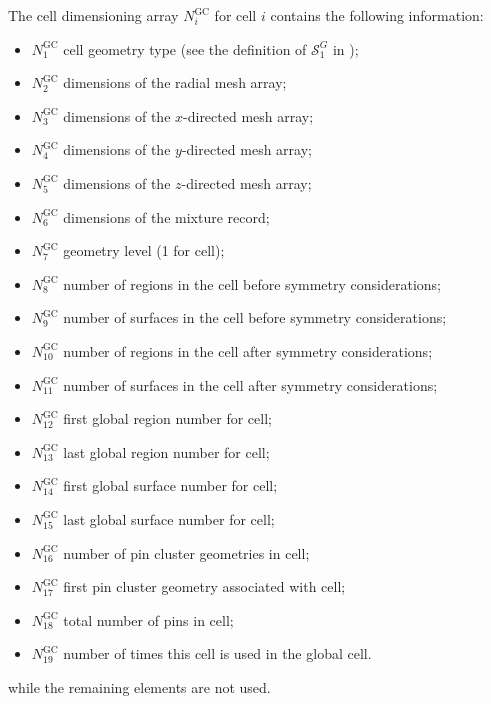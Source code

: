 The cell dimensioning array $N^{\text{GC}}_{i}$ for cell $i$ contains the following information:
\begin{itemize}
\item $N^{\text{GC}}_{1}$ cell geometry type (see the definition of $\mathcal{S}^{G}_{1}$ in );
\item $N^{\text{GC}}_{2}$ dimensions of the radial mesh array; 
\item $N^{\text{GC}}_{3}$ dimensions of the $x$-directed mesh array;  
\item $N^{\text{GC}}_{4}$ dimensions of the $y$-directed mesh array;  
\item $N^{\text{GC}}_{5}$ dimensions of the $z$-directed mesh array;  
\item $N^{\text{GC}}_{6}$ dimensions of the mixture record;
\item $N^{\text{GC}}_{7}$ geometry level (1 for cell);
\item $N^{\text{GC}}_{8}$ number of regions in the cell before symmetry considerations;
\item $N^{\text{GC}}_{9}$ number of surfaces in the cell before symmetry considerations;
\item $N^{\text{GC}}_{10}$ number of regions in the cell after symmetry considerations;
\item $N^{\text{GC}}_{11}$ number of surfaces in the cell after symmetry considerations;
\item $N^{\text{GC}}_{12}$ first global region number for cell;
\item $N^{\text{GC}}_{13}$ last global region number for cell;
\item $N^{\text{GC}}_{14}$ first global surface number for cell;
\item $N^{\text{GC}}_{15}$ last global surface number for cell;
\item $N^{\text{GC}}_{16}$ number of pin cluster geometries in cell;
\item $N^{\text{GC}}_{17}$ first pin cluster geometry associated with cell;
\item $N^{\text{GC}}_{18}$ total number of pins in cell;
\item $N^{\text{GC}}_{19}$ number of times this cell is used in the global cell.
\end{itemize}
while the remaining elements are not used. 

